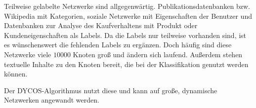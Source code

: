 Teilweise gelabelte Netzwerke sind allgegenwärtig. Publikationsdatenbanken
bzw. Wikipedia mit Kategorien, soziale Netzwerke mit Eigenschaften der 
Benutzer und Datenbanken zur Analyse des Kaufverhaltens mit 
Produkt oder Kundeneigenschaften als Labels. Da die Labels nur 
teilweise vorhanden sind, ist es wünschenswert die fehlenden Labels
zu ergänzen. Doch häufig sind diese Netzwerke viele $\num{10000}$ 
Knoten groß und ändern sich laufend. Außerdem stehen textuelle
Inhalte zu den Knoten bereit, die bei der Klassifikation genutzt 
werden können.

Der DYCOS-Algorithmus nutzt diese und kann auf große, dynamische
Netzwerken angewandt werden.

